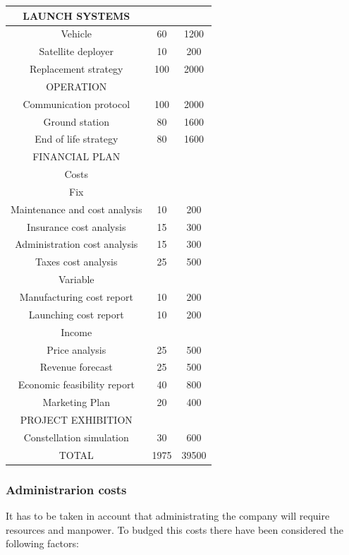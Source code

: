 \begin{longtable}{ccc}
	\rowcolor[gray]{0.85}
	LAUNCH SYSTEMS &  &  \\ \hline
	Vehicle & 60 & 1200 \\ \hline
	Satellite deployer & 10 & 200 \\ \hline
	Replacement strategy & 100 & 2000 \\ \hline
	\rowcolor[gray]{0.85}
	OPERATION &  &  \\ \hline
	Communication protocol & 100 & 2000 \\ \hline
	Ground station & 80 & 1600 \\ \hline
	End of life strategy & 80 & 1600 \\ \hline
	\rowcolor[gray]{0.85}
	FINANCIAL PLAN &  &  \\ \hline
	Costs &  &  \\ \hline
	Fix &  &  \\ \hline
	Maintenance and cost analysis & 10 & 200 \\ \hline
	Insurance cost analysis & 15 & 300 \\ \hline
	Administration cost analysis & 15 & 300 \\ \hline
	Taxes cost analysis & 25 & 500 \\ \hline
	Variable &  &  \\ \hline
	Manufacturing cost report & 10 & 200 \\ \hline
	Launching cost report & 10 & 200 \\ \hline
	Income &  &  \\ \hline
	Price analysis & 25 & 500 \\ \hline
	Revenue forecast & 25 & 500 \\ \hline
	Economic feasibility report & 40 & 800 \\ \hline
	Marketing Plan & 20 & 400 \\ \hline
	\rowcolor[gray]{0.85}
	PROJECT EXHIBITION &  &  \\ \hline
	Constellation simulation & 30 & 600 \\ \hline
	\rowcolor[gray]{0.65}
	TOTAL & 1975 & 39500 \\
	\bottomrule
\end{longtable}

\subsubsection{Administrarion costs}
It has to be taken in account that administrating the company will require resources and manpower. To budged this costs there have been considered the following factors:


